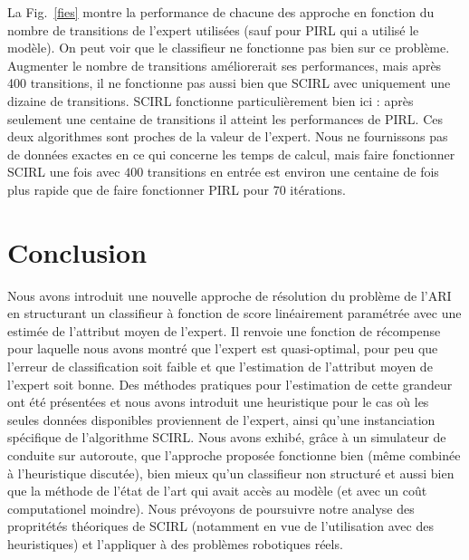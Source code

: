 \documentclass[french,utf8]{./hermes-journal}
\begin{document}
La Fig.~\ref{fies} montre la performance de chacune des approche en fonction du nombre de transitions de l'expert utilisées (sauf pour PIRL qui a utilisé le modèle). On peut voir que le classifieur ne fonctionne pas bien sur ce problème. Augmenter le nombre de transitions améliorerait ses performances, mais après 400 transitions, il ne fonctionne pas aussi bien que SCIRL avec uniquement une dizaine de transitions. SCIRL fonctionne particulièrement bien ici : après seulement une centaine de transitions il atteint les performances de PIRL. Ces deux algorithmes sont proches de la valeur de l'expert. Nous ne fournissons pas de données exactes en ce qui concerne les temps de calcul, mais faire fonctionner SCIRL une fois avec $400$ transitions en entrée est environ une centaine de fois plus rapide que de faire fonctionner PIRL pour $70$ itérations.
%



\section{Conclusion}
\label{seonclusion}

Nous avons introduit une nouvelle approche de résolution du problème de l'ARI en structurant un classifieur à fonction de score linéairement paramétrée avec une estimée de l'attribut moyen de l'expert. Il renvoie une fonction de récompense pour laquelle nous avons montré que l'expert est quasi-optimal, pour peu que l'erreur de classification soit faible et que l'estimation de l'attribut moyen de l'expert soit bonne. Des méthodes pratiques pour l'estimation de cette grandeur ont été présentées et nous avons introduit une heuristique pour le cas où les seules données disponibles proviennent de l'expert, ainsi qu'une instanciation spécifique de l'algorithme SCIRL. Nous avons exhibé, grâce à un simulateur de conduite sur autoroute, que l'approche proposée fonctionne bien (même combinée à l'heuristique discutée), bien mieux qu'un classifieur non structuré et aussi bien que la méthode de l'état de l'art qui avait accès au modèle (et avec un coût computationel moindre). Nous prévoyons de poursuivre notre analyse des propritétés théoriques de SCIRL (notamment en vue de l'utilisation avec des heuristiques) et l'appliquer à des problèmes robotiques réels.


\newpage

\end{document}
